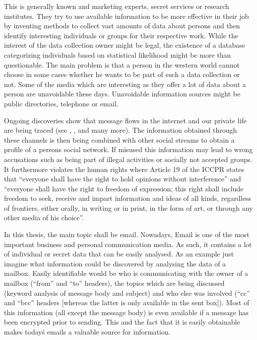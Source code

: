 \documentclass[twocolumn,a4paper,10pt,english]{scrartcl}
\begin{document}
This is generally known and marketing experts, secret services or research institutes. They try to use available information to be more effective in their job by inventing methods to collect vast amounts of data about persons and then identify interesting individuals or groups for their respective work. While the interest of the data collection owner might be legal, the existence of a database categorizing individuals based on statistical likelihood might be more than questionable. The main problem is that a person in the western world cannot choose in some cases whether he wants to be part of such a data collection or not. Some of the media which are interesting as they offer a lot of data about a person are unavoidable these days. Unavoidable information sources might be public directories, telephone or email.\par

Ongoing discoveries show that message flows in the internet and our private life are being traced (see \cite{ECHELON}, \cite{wiki:prism}, \cite{wiki:tempora} and many more). The information obtained through these channels is then being combined with other social streams to obtain a profile of a persons social network. If misused this information may lead to wrong accusations such as being part of illegal activities or socially not accepted groups. It furthermore violates the human rights where Article 19 of the ICCPR states that ``everyone shall have the right to hold opinions without interference'' and ``everyone shall have the right to freedom of expression; this right shall include freedom to seek, receive and impart information and ideas of all kinds, regardless of frontiers, either orally, in writing or in print, in the form of art, or through any other media of his choice''\cite{iccpr}.\par

In this thesis, the main topic shall be email. Nowadays, Email is one of the most important business and personal communication media. As such, it contains a lot of individual or secret data that can be easily analysed. As an example just imagine what information could be discovered by analysing the data of a mailbox. Easily identifiable would be who is communicating with the owner of a mailbox (``from'' and ``to'' headers), the topics which are being discussed (keyword analysis of message body and subject) and who else was involved (``cc'' and ``bcc'' headers [whereas the latter is only available in the sent box]). Most of this information (all except the message body) is even available if a message has been encrypted prior to sending. This and the fact that it is easily obtainable makes today\'s emails a valuable source for information.\par
\end{document}
